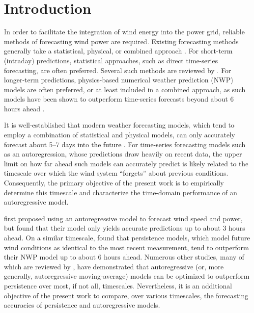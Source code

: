 \documentclass[11pt, oneside]{article}
\begin{document}

\newpage
\pagestyle{pages}
\section{Introduction}
In order to facilitate the integration of wind energy into the power grid, reliable methods of forecasting wind power are required.
Existing forecasting methods generally take a statistical, physical, or combined approach \citep{Wang2011}.
For short-term (intraday) predictions, statistical approaches, such as direct time-series forecasting, are often preferred.
Several such methods are reviewed by \citet[Chap.~2]{Giebel2011}.
For longer-term predictions, physics-based numerical weather prediction (NWP) models are often preferred, or at least included in a combined approach, as such models have been shown to outperform time-series forecasts beyond about 6 hours ahead \citep[Sec.~1.3]{Giebel2011}.

It is well-established that modern weather forecasting models, which tend to employ a combination of statistical and physical models, can only accurately forecast about 5--7 days into the future \citep[Sec.~1.2]{Giebel2011}.
For time-series forecasting models such as an autoregression, whose predictions draw heavily on recent data, the upper limit on how far ahead such models can accurately predict is likely related to the timescale over which the wind system ``forgets'' about previous conditions.
Consequently, the primary objective of the present work is to empirically determine this timescale and characterize the time-domain performance of an autoregressive model.

\citet{Brown1984} first proposed using an autoregressive model to forecast wind speed and power, but found that their model only yields accurate predictions up to about 3 hours ahead.
On a similar timescale, \citet{LandbergWatson1994} found that persistence models, which model future wind conditions as identical to the most recent measurement, tend to outperform their NWP model up to about 6 hours ahead.
Numerous other studies, many of which are reviewed by \citet[Sec.~2.1]{Giebel2011}, have demonstrated that autoregressive (or, more generally, autoregressive moving-average) models can be optimized to outperform persistence over most, if not all, timescales.
Nevertheless, it is an additional objective of the present work to compare, over various timescales, the forecasting accuracies of persistence and autoregressive models.
\end{document}
